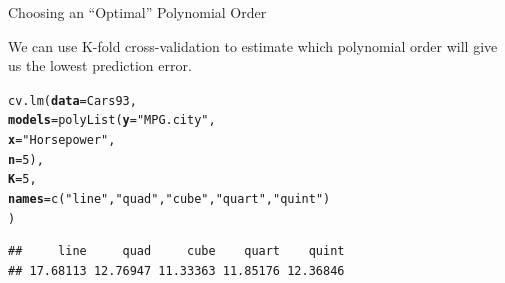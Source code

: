 \documentclass{beamer}\usepackage[]{graphicx}\usepackage[]{color}
\makeatletter
\newcommand{\hlnum}[1]{\textcolor[rgb]{0.69,0.494,0}{#1}}%
\newcommand{\hlstr}[1]{\textcolor[rgb]{0.749,0.012,0.012}{#1}}%
\newcommand{\hlstd}[1]{\textcolor[rgb]{0,0,0}{#1}}%
\newcommand{\hlkwc}[1]{\textcolor[rgb]{0,0,0}{\textbf{#1}}}%
\newcommand{\hlkwd}[1]{\textcolor[rgb]{0.004,0.004,0.506}{#1}}%
\newenvironment{kframe}{%
 \def\at@end@of@kframe{}%
 \ifinner\ifhmode%
  \def\at@end@of@kframe{\end{minipage}}%
  \begin{minipage}{\columnwidth}%
 \fi\fi%
 \def\FrameCommand##1{\hskip\@totalleftmargin \hskip-\fboxsep
 \colorbox{shadecolor}{##1}\hskip-\fboxsep
     \hskip-\linewidth \hskip-\@totalleftmargin \hskip\columnwidth}%
 \MakeFramed {\advance\hsize-\width
   \@totalleftmargin\z@ \linewidth\hsize
   \@setminipage}}%
 {\par\unskip\endMakeFramed%
 \at@end@of@kframe}
\newenvironment{knitrout}{}{} %
\makeatother
\begin{document}
\begin{frame}[fragile]{Choosing an ``Optimal'' Polynomial Order}
  
  We can use K-fold cross-validation to estimate which polynomial order will 
  give us the lowest prediction error.
\begin{knitrout}\footnotesize
{}\color{fgcolor}\begin{kframe}
\begin{alltt}
\hlkwd{cv.lm}\hlstd{(}\hlkwc{data}   \hlstd{= Cars93,}
      \hlkwc{models} \hlstd{=} \hlkwd{polyList}\hlstd{(}\hlkwc{y} \hlstd{=} \hlstr{"MPG.city"}\hlstd{,}
                        \hlkwc{x} \hlstd{=} \hlstr{"Horsepower"}\hlstd{,}
                        \hlkwc{n} \hlstd{=} \hlnum{5}\hlstd{),}
      \hlkwc{K}      \hlstd{=} \hlnum{5}\hlstd{,}
      \hlkwc{names}  \hlstd{=} \hlkwd{c}\hlstd{(}\hlstr{"line"}\hlstd{,} \hlstr{"quad"}\hlstd{,} \hlstr{"cube"}\hlstd{,} \hlstr{"quart"}\hlstd{,} \hlstr{"quint"}\hlstd{)}
      \hlstd{)}
\end{alltt}
\begin{verbatim}
##     line     quad     cube    quart    quint 
## 17.68113 12.76947 11.33363 11.85176 12.36846
\end{verbatim}
\end{kframe}
\end{knitrout}

\end{frame}

\end{document}

